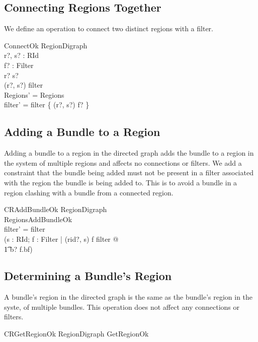 \documentclass[a4paper,9pt,twoside]{article}
\begin{document}
\subsection{Connecting Regions Together}

We define an operation to connect two distinct regions with a filter.
\begin{schema}{ConnectOk}
  \Delta RegionDigraph \\
  r?, s? : RId \\
  f? : Filter \\
\where
  r? \neq s? \\
  (r?, s?) \notin \dom filter \\
  \theta Regions' = \theta Regions \\
  filter' = filter \cup \{ (r?, s?) \mapsto f? \} \\
\end{schema}

\subsection{Adding a Bundle to a Region}

Adding a bundle to a region in the directed graph adds the bundle to a region in the
system of multiple regions and affects no connections or filters.
We add a constraint that the bundle being added must not 
be present in a filter associated with the region the bundle is being added to.
This is to avoid a bundle in a region clashing with a bundle from a connected region.
\begin{schema}{CRAddBundleOk}
  \Delta RegionDigraph \\
  RegionsAddBundleOk \\
\where
  filter' = filter \\
  (\forall s : RId; f : Filter | (rid?, s) \mapsto f \in filter @ \\
\t1 b? \notin f.bf) \\ 
\end{schema}

\subsection{Determining a Bundle's Region}

A bundle's region in the directed graph is the same as the bundle's
region in the syste, of multiple bundles.
This operation does not affect any connections or filters.
\begin{zed}
  CRGetRegionOk  \Xi RegionDigraph \land GetRegionOk \\
\end{zed}
\end{document}

